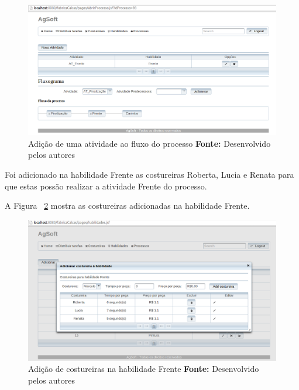 \newpage

\begin{figure}[h!]
	\centerline{\includegraphics[scale=0.3]{./imagens/adicionar_atividade_frente_teste4.png}}
	\caption[Adição de uma atividade ao fluxo do processo]
	{Adição de uma atividade ao fluxo do processo \textbf{Fonte:} Desenvolvido pelos autores}
	\label{fig:add_frente_teste4}
\end{figure}


\par Foi adicionado na habilidade Frente as costureiras Roberta, Lucia e Renata
para que estas possão realizar a atividade Frente do processo.
\par A Figura ~\ref{fig:add_costureira_frente_teste4} mostra as costureiras
adicionadas na habilidade Frente.

\begin{figure}[h!]
	\centerline{\includegraphics[scale=0.3]{./imagens/costureiras_at_frente_tete5.png}}
	\caption[Adição de costureiras na habilidade Frente]
	{Adição de costureiras na habilidade Frente \textbf{Fonte:} Desenvolvido pelos autores}
	\label{fig:add_costureira_frente_teste4}
\end{figure}

